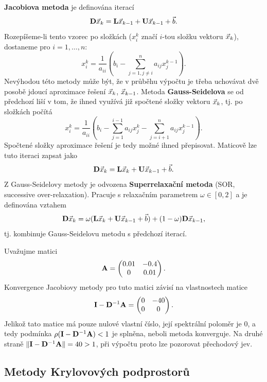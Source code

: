 {\bf Jacobiova metoda} je definována iterací
$$ \mathbf{D}\vec{x}_k=\mathbf{L}\vec{x}_{k-1} + \mathbf{U}\vec{x}_{k-1} + \vec{b}. $$
Rozepíšeme-li tento vzorec po složkách ($x_i^k$ značí $i$-tou složku vektoru $\vec{x}_k$), dostaneme pro $i=1,\ldots,n$:
$$ x_i^k = \frac1{a_{ii}}\left(b_i-\sum_{j=1,j\neq i}^n a_{ij}x_j^{k-1}\right). $$
Nevýhodou této metody může být, že v průběhu výpočtu je třeba uchovávat dvě posobě jdoucí aproximace řešení $\vec{x}_k$, $\vec{x}_{k-1}$.
Metoda {\bf Gauss-Seidelova} se od předchozí liší v tom, že ihned využívá již spočtené složky vektoru $\vec{x}_k$, tj. po složkách počítá
$$ x_i^k = \frac1{a_{ii}}\left(b_i-\sum_{j=1}^{i-1} a_{ij}x_j^k-\sum_{j=i+1}^n a_{ij}x_j^{k-1}\right). $$
Spočtené složky aproximace řešení je tedy možné ihned přepisovat.
Maticově lze tuto iteraci zapsat jako
$$ \mathbf{D}\vec{x}_k=\mathbf{L}\vec{x}_k+\mathbf{U}\vec{x}_{k-1}+\vec{b}. $$
Z Gauss-Seidelovy metody je odvozena {\bf Superrelaxační metoda} (SOR, successive over-relaxation).
Pracuje s relaxačním parametrem $\omega\in[0,2]$ a je definována vztahem
$$ \mathbf{D}\vec{x}_k = \omega(\mathbf{L}\vec{x}_k+\mathbf{U}\vec{x}_{k-1}+\vec{b}) + (1-\omega)\mathbf{D}\vec{x}_{k-1}, $$
tj. kombinuje Gauss-Seidelovu metodu s předchozí iterací.
\begin{ex}
Uvažujme matici
\[ \mathbf{A} = \begin{pmatrix}0.01 & -0.4\\0&0.01\end{pmatrix}. \]
Konvergence Jacobiovy metody pro tuto matici závisí na vlastnostech matice
\[ \mathbf{I} - \mathbf{D}^{-1}\mathbf{A} = \begin{pmatrix}0&-40\\0&0\end{pmatrix}. \]
Jelikož tato matice má pouze nulové vlastní číslo, její spektrální poloměr je $0$, a tedy podmínka $\rho(\mathbf{I}-\mathbf{D}^{-1}\mathbf{A})<1$ je splněna, neboli metoda konverguje.
Na druhé straně $\|\mathbf{I}-\mathbf{D}^{-1}\mathbf{A}\|=40>1$, při výpočtu proto lze pozorovat přechodový jev.
\end{ex}






\subsection{Metody Krylovových podprostorů}

